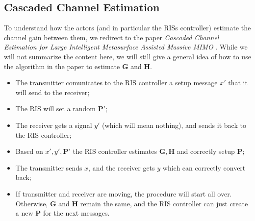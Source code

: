 \newpage
\subsection{Cascaded Channel Estimation}
To understand how the actors (and in particular the RISs controller) estimate the channel gain between them, we redirect to the paper \textit{Cascaded Channel Estimation for Large Intelligent Metasurface Assisted Massive MIMO} \cite{8879620}. While we will not summarize the content here, we will still give a general idea of how to use the algorithm in the paper to estimate $\bm{G}$ and $\bm{H}$.
\begin{itemize}
  \item The transmitter comunicates to the RIS controller a setup message $x'$ that it will send to the receiver;
  \item The RIS will set a random $\bm{P}'$; %
  \item The receiver gets a signal $y'$ (which will mean nothing), and sends it back to the RIS controller;
  \item Based on $x', y', \bm{P}'$ the RIS controller estimates $\bm{G}, \bm{H}$ and correctly setup $\bm{P}$;
  \item The transmitter sends $x$, and the receiver gets $y$ which can correctly convert back;
  \item If transmitter and receiver are moving, the procedure will start all over. Otherwise, $\bm{G}$ and $\bm{H}$ remain the same, and the RIS controller can just create a new $\bm{P}$ for the next messages.
\end{itemize}
